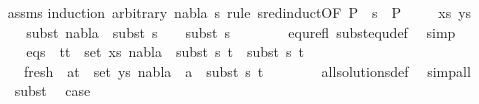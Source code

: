 \begin{isabellebody}
%
\isadelimproof
\ \ %
\endisadelimproof
%
\isatagproof
{}\isamarkupfalse%
\ assms\isanewline
{}\isamarkupfalse%
{\isacharparenleft}{\kern0pt}induction\ arbitrary{\isacharcolon}{\kern0pt}\ nabla{}\ s{}\ rule{\isacharcolon}{\kern0pt}\ s{\isacharunderscore}{\kern0pt}red{\isachardot}{\kern0pt}induct{\isacharbrackleft}{\kern0pt}OF\ {\isacartoucheopen}P{}\ {\isasymturnstile}\ s{}\ {\isasymleadsto}\ P{}{\isacartoucheclose}{\isacharbrackright}{\kern0pt}{\isacharparenright}{\kern0pt}\isanewline
\ \ \isamarkupfalse%
\ {\isacharparenleft}{\kern0pt}{}\ xs\ ys{\isacharparenright}{\kern0pt}\isanewline
\ \ \ \isamarkupfalse%
\ \isamarkupfalse%
\ subst{\isacharcolon}{\kern0pt}\ {\isachardoublequoteopen}nabla{}\ {\isasymTurnstile}\ subst\ {\isacharparenleft}{\kern0pt}s{}\ {\isasymbullet}\ {\isacharbrackleft}{\kern0pt}{\isacharbrackright}{\kern0pt}{\isacharparenright}{\kern0pt}\ {\isasymapprox}\ subst\ s{}{\isachardoublequoteclose}\ \isanewline
\ \ \ \ \ \isamarkupfalse%
\ equ{\isacharunderscore}{\kern0pt}refl\ subst{\isacharunderscore}{\kern0pt}equ{\isacharunderscore}{\kern0pt}def\ \isamarkupfalse%
\ simp\isanewline
\ \ \ \isamarkupfalse%
\ {}\isanewline
\ \ \ \isamarkupfalse%
\ eqs{\isacharcolon}{\kern0pt}\ {\isachardoublequoteopen}{\isasymforall}\ {\isacharparenleft}{\kern0pt}t{}{\isacharcomma}{\kern0pt}t{}{\isacharparenright}{\kern0pt}\ {\isasymin}\ set\ xs{\isachardot}{\kern0pt}\ nabla{}\ {\isasymturnstile}\ subst\ s{}\ t{}\ {\isasymapprox}\ subst\ s{}\ t{}{\isachardoublequoteclose}\ \isanewline
\ \ \ \ \ \ fresh{\isacharcolon}{\kern0pt}\ {\isachardoublequoteopen}{\isasymforall}\ {\isacharparenleft}{\kern0pt}a{\isacharcomma}{\kern0pt}t{\isacharparenright}{\kern0pt}\ {\isasymin}\ set\ ys{\isachardot}{\kern0pt}\ nabla{}\ {\isasymturnstile}\ a\ {\isasymsharp}\ subst\ s{}\ t{\isachardoublequoteclose}\ \isanewline
\ \ \ \ \ \isamarkupfalse%
\ all{\isacharunderscore}{\kern0pt}solutions{\isacharunderscore}{\kern0pt}def\ \isamarkupfalse%
\ simp{\isacharunderscore}{\kern0pt}all\isanewline
\ \ \ \isamarkupfalse%
\ subst\ \isamarkupfalse%
\ {\isacharquery}{\kern0pt}case\isanewline

\end{isabellebody}
